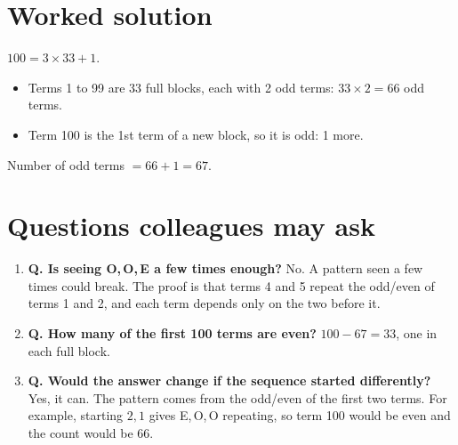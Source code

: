 \documentclass[11pt,a4paper]{article}
\begin{document}
\section{Worked solution}
$100 = 3 \times 33 + 1$.
\begin{itemize}
  \item Terms 1 to 99 are 33 full blocks, each with 2 odd terms: $33 \times 2 = 66$ odd terms.
  \item Term 100 is the 1st term of a new block, so it is odd: 1 more.
\end{itemize}
Number of odd terms $= 66 + 1 = \boxed{67}$.

\section{Questions colleagues may ask}
\begin{enumerate}
  \item \textbf{Q. Is seeing O,\,O,\,E a few times enough?}
        No. A pattern seen a few times could break. The proof is that terms 4 and 5 repeat
        the odd/even of terms 1 and 2, and each term depends only on the two before it.
  \item \textbf{Q. How many of the first 100 terms are even?} $100 - 67 = 33$, one in each
        full block.
  \item \textbf{Q. Would the answer change if the sequence started differently?}
        Yes, it can. The pattern comes from the odd/even of the first two terms. For
        example, starting $2, 1$ gives E,\,O,\,O repeating, so term 100 would be even and
        the count would be 66.
\end{enumerate}
\end{document}

